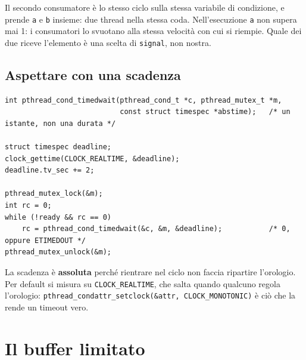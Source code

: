 Il secondo consumatore è lo stesso ciclo sulla stessa variabile di condizione, e prende \texttt{a} e \texttt{b} insieme:
due thread nella stessa coda. Nell'esecuzione \texttt{a} non supera mai 1: i consumatori lo svuotano alla stessa velocità
con cui si riempie. Quale dei due riceve l'elemento è una scelta di \texttt{signal}, non nostra.

\subsection{Aspettare con una scadenza}

\begin{lstlisting}[language={[POSIX]C}, style=wnumbers]
int pthread_cond_timedwait(pthread_cond_t *c, pthread_mutex_t *m,
                           const struct timespec *abstime);   /* un istante, non una durata */

struct timespec deadline;
clock_gettime(CLOCK_REALTIME, &deadline);
deadline.tv_sec += 2;

pthread_mutex_lock(&m);
int rc = 0;
while (!ready && rc == 0)
    rc = pthread_cond_timedwait(&c, &m, &deadline);           /* 0, oppure ETIMEDOUT */
pthread_mutex_unlock(&m);
\end{lstlisting}

La scadenza è \textbf{assoluta} perché rientrare nel ciclo non faccia ripartire l'orologio. Per default si misura su
\texttt{CLOCK\_REALTIME}, che salta quando qualcuno regola l'orologio: \texttt{pthread\_condattr\_setclock(\&attr,
CLOCK\_MONOTONIC)} è ciò che la rende un timeout vero.

\section{Il buffer limitato}

